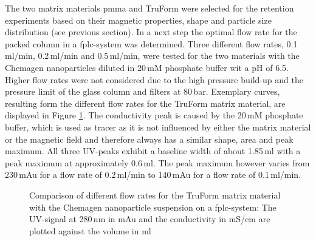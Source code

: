 The two matrix materials \gls{pmma} and TruForm were selected for the retention experiments based on their magnetic properties, shape and particle size distribution (see previous section). In a next step the optimal flow rate for the packed column in a \gls{fplc}-system was determined. Three different flow rates, 0.1\,ml/min, 0.2\,ml/min and 0.5\,ml/min, were tested for the two materials with the Chemagen nanoparticles diluted in 20\,mM phosphate buffer wit a pH of 6.5. Higher flow rates were not considered due to the high pressure build-up and the pressure limit of the glass column and filters at 80\,bar. Exemplary curves, resulting form the different flow rates for the TruForm matrix material, are displayed in Figure \ref{fig:flowrate_prax}. The conductivity peak is caused by the 20\,mM phosphate buffer, which is used as tracer as it is not influenced by either the matrix material or the magnetic field and therefore always has a similar shape, area and peak maximum. All three UV-peaks exhibit a baseline width of about 1.85\,ml with a peak maximum at approximately 0.6\,ml. The peak maximum however varies from 230\,mAu for a flow rate of 0.2\,ml/min to 140\,mAu for a flow rate of 0.1\,ml/min.

\begin{figure}[H]
\centering

\caption[Comparison of different flow rates for the TruForm matrix material]{Comparison of different flow rates for the TruForm matrix material with the Chemagen nanoparticle suspension on a \gls{fplc}-system: The UV-signal at 280\,nm in mAu and the conductivity in mS/cm are plotted against the volume in ml   
\label{fig:flowrate_prax}
}
\end{figure}

